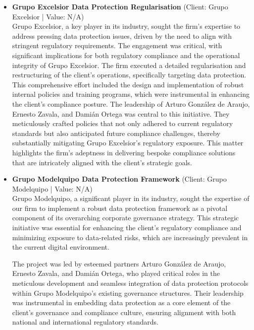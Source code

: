 \documentclass[11pt]{article}
\begin{document}
\begin{itemize}
\item \textbf{Grupo Excelsior Data Protection Regularisation} (Client: Grupo Excelsior | Value: N/A)\\ Grupo Excelsior, a key player in its industry, sought the firm's expertise to address pressing data protection issues, driven by the need to align with stringent regulatory requirements. The engagement was critical, with significant implications for both regulatory compliance and the operational integrity of Grupo Excelsior. The firm executed a detailed regularisation and restructuring of the client's operations, specifically targeting data protection. This comprehensive effort included the design and implementation of robust internal policies and training programs, which were instrumental in enhancing the client's compliance posture. The leadership of Arturo González de Araujo, Ernesto Zavala, and Damián Ortega was central to this initiative. They meticulously crafted policies that not only adhered to current regulatory standards but also anticipated future compliance challenges, thereby substantially mitigating Grupo Excelsior's regulatory exposure. This matter highlights the firm's adeptness in delivering bespoke compliance solutions that are intricately aligned with the client's strategic goals.
\item \textbf{Grupo Modelquipo Data Protection Framework} (Client: Grupo Modelquipo | Value: N/A)\\ Grupo Modelquipo, a significant player in its industry, sought the expertise of our firm to implement a robust data protection framework as a pivotal component of its overarching corporate governance strategy. This strategic initiative was essential for enhancing the client's regulatory compliance and minimizing exposure to data-related risks, which are increasingly prevalent in the current digital environment. 

The project was led by esteemed partners Arturo González de Araujo, Ernesto Zavala, and Damián Ortega, who played critical roles in the meticulous development and seamless integration of data protection protocols within Grupo Modelquipo's existing governance structures. Their leadership was instrumental in embedding data protection as a core element of the client's governance and compliance culture, ensuring alignment with both national and international regulatory standards.


\end{itemize}
\end{document}

